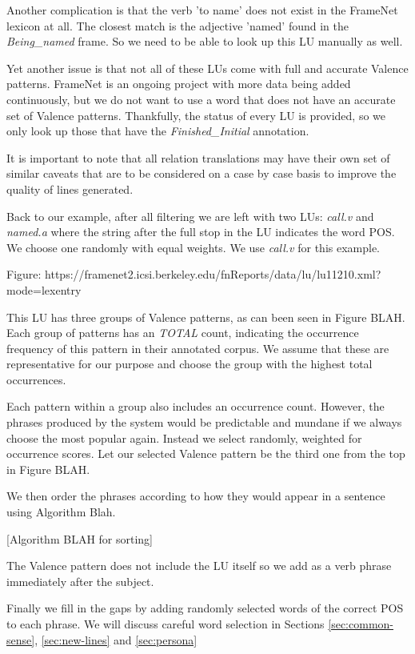 Another complication is that the verb 'to name' does not exist in the FrameNet lexicon at all. The closest match is the adjective 'named' found in the \textit{Being\_named} frame. So we need to be able to look up this LU manually as well.

Yet another issue is that not all of these LUs come with full and accurate Valence patterns. FrameNet is an ongoing project with more data being added continuously, but we do not want to use a word that does not have an accurate set of Valence patterns. Thankfully, the status of every LU is provided, so we only look up those that have the \textit{Finished\_Initial} annotation.

It is important to note that all relation translations may have their own set of similar caveats that are to be considered on a case by case basis to improve the quality of lines generated.

Back to our example, after all filtering we are left with two LUs: \textit{call.v} and \textit{named.a} where the string after the full stop in the LU indicates the word POS. We choose one randomly with equal weights. We use \textit{call.v} for this example.

Figure: https://framenet2.icsi.berkeley.edu/fnReports/data/lu/lu11210.xml?mode=lexentry

This LU has three groups of Valence patterns, as can been seen in Figure BLAH. Each group of patterns has an \textit{TOTAL} count, indicating the occurrence frequency of this pattern in their annotated corpus. We assume that these are representative for our purpose and choose the group with the highest total occurrences.

Each pattern within a group also includes an occurrence count. However, the phrases produced by the system would be predictable and mundane if we always choose the most popular again. Instead we select randomly, weighted for occurrence scores. Let our selected Valence pattern be the third one from the top in Figure BLAH.

We then order the phrases according to how they would appear in a sentence using Algorithm Blah.

[Algorithm BLAH for sorting]

The Valence pattern does not include the LU itself so we add as a verb phrase immediately after the subject.

Finally we fill in the gaps by adding randomly selected words of the correct POS to each phrase. We will discuss careful word selection in Sections \ref{sec:common-sense}, \ref{sec:new-lines} and \ref{sec:persona}

